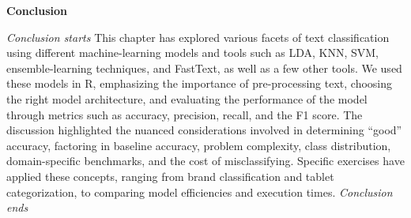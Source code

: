 \textbf{Conclusion}

\emph{Conclusion starts} This chapter has explored various facets of text
classification using different machine-learning models and tools such as
LDA, KNN, SVM, ensemble-learning techniques, and FastText, as well as a few other tools. We used these models in R,
emphasizing the importance of pre-processing text, choosing the
right model architecture, and evaluating the performance of the model through
metrics such as accuracy, precision, recall, and the F1 score. The
discussion highlighted the nuanced considerations involved in determining
``good'' accuracy, factoring in baseline accuracy, problem complexity,
class distribution, domain-specific benchmarks, and the cost of
misclassifying. Specific exercises have applied these
concepts, ranging from brand classification and tablet categorization, to
comparing model efficiencies and execution times. \emph{Conclusion ends}

